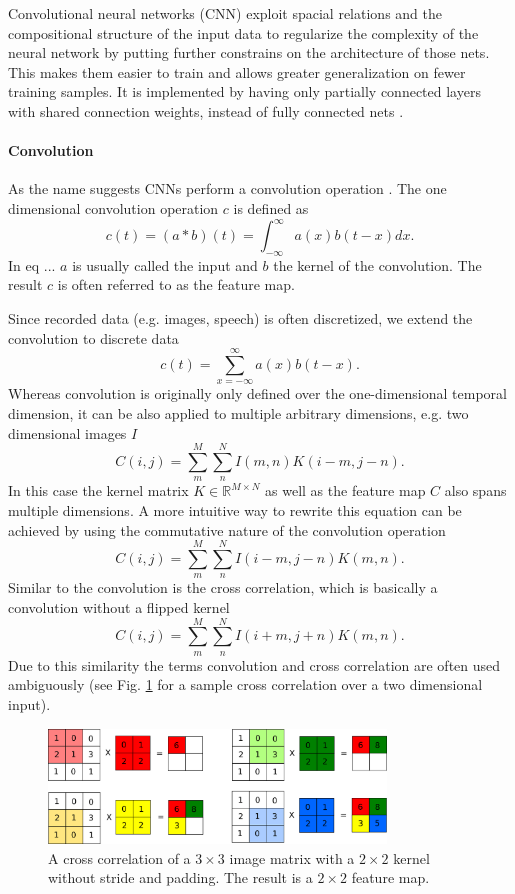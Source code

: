 Convolutional neural networks (CNN) exploit spacial relations and the compositional structure of the input data to regularize the complexity of the neural network by putting further constrains on the architecture of those nets.
This makes them easier to train and allows greater generalization on fewer training samples.
It is implemented by having only partially connected layers with shared connection weights, instead of fully connected nets \cite{lecun1989backpropagation}\cite{Goodfellow-et-al-2016-Book}.    

\paragraph{Convolution}

As the name suggests CNNs perform a convolution operation \cite{Goodfellow-et-al-2016-Book}. The one dimensional convolution operation $c$ is defined as
\[
c(t) = (a * b)(t) = \int_{- \infty}^{\infty} a(x)b(t-x) dx.
\]
In eq ... $a$ is usually called the input and $b$ the kernel of the convolution. The result $c$ is often referred to as the feature map.

Since recorded data (e.g. images, speech) is often discretized, we extend the convolution to discrete data
\[
c(t) = \sum_{x = - \infty}^{\infty} a(x)b(t-x).
\]
Whereas convolution is originally only defined over the one-dimensional temporal dimension, it can be also applied to multiple arbitrary dimensions, e.g. two dimensional images $I$
\[
C(i,j) = \sum_m^M \sum_n^N I(m,n) K(i - m, j -n).
\]
In this case the kernel matrix $K \in \mathbb{R}^{M \times N} $ as well as the feature map $C$ also spans multiple dimensions.
A more intuitive way to rewrite this equation can be achieved by using the commutative nature of the convolution operation
\[
C(i,j) = \sum_m^M \sum_n^N I(i - m,j - n) K(m, n).
\]
Similar to the convolution is the cross correlation, which is basically a convolution without a flipped kernel
\[
C(i,j) = \sum_m^M \sum_n^N I(i + m,j + n) K(m, n).
\]
Due to this similarity the terms convolution and cross correlation are often used ambiguously (see Fig. \ref{fig:conv} for a sample cross correlation over a two dimensional input).

\begin{figure}
	\centering
    	\includegraphics[width=0.8\textwidth]{imgs/convolution.png} 
    \caption{A cross correlation of a $3\times3$ image matrix with a $2\times2$ kernel without stride and padding. The result is a $2\times2$ feature map.}
	\label{fig:conv}
\end{figure}


